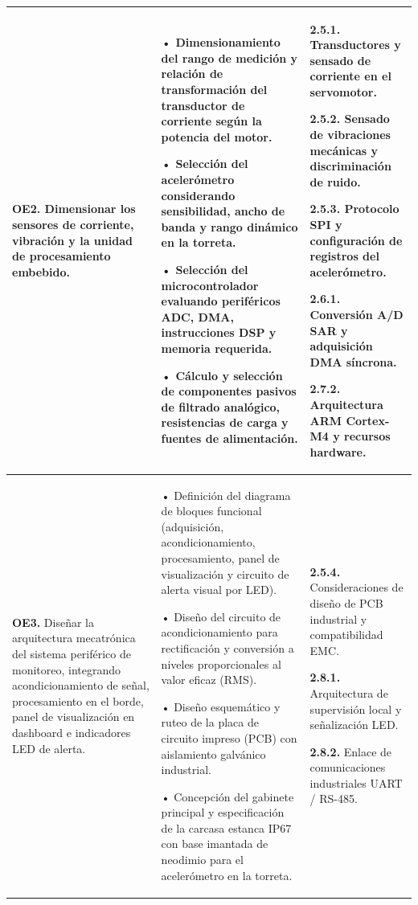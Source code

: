 {\begin{longtable}{>{\raggedright\arraybackslash}p{3.3cm}>{\raggedright\arraybackslash}p{5.2cm}>{\raggedright\arraybackslash}p{5.2cm}}
\textbf{OE2.} Dimensionar los sensores de corriente, vibración y la unidad de procesamiento embebido. &
• Dimensionamiento del rango de medición y relación de transformación del transductor de corriente según la potencia del motor.\par\vspace{1mm}
• Selección del acelerómetro considerando sensibilidad, ancho de banda y rango dinámico en la torreta.\par\vspace{1mm}
• Selección del microcontrolador evaluando periféricos ADC, DMA, instrucciones DSP y memoria requerida.\par\vspace{1mm}
• Cálculo y selección de componentes pasivos de filtrado analógico, resistencias de carga y fuentes de alimentación. &
\textbf{2.5.1.} Transductores y sensado de corriente en el servomotor.\par\vspace{1mm}
\textbf{2.5.2.} Sensado de vibraciones mecánicas y discriminación de ruido.\par\vspace{1mm}
\textbf{2.5.3.} Protocolo SPI y configuración de registros del acelerómetro.\par\vspace{1mm}
\textbf{2.6.1.} Conversión A/D SAR y adquisición DMA síncrona.\par\vspace{1mm}
\textbf{2.7.2.} Arquitectura ARM Cortex-M4 y recursos hardware. \\ \hline

\textbf{OE3.} Diseñar la arquitectura mecatrónica del sistema periférico de monitoreo, integrando acondicionamiento de señal, procesamiento en el borde, panel de visualización en dashboard e indicadores LED de alerta. &
• Definición del diagrama de bloques funcional (adquisición, acondicionamiento, procesamiento, panel de visualización y circuito de alerta visual por LED).\par\vspace{1mm}
• Diseño del circuito de acondicionamiento para rectificación y conversión a niveles proporcionales al valor eficaz (RMS).\par\vspace{1mm}
• Diseño esquemático y ruteo de la placa de circuito impreso (PCB) con aislamiento galvánico industrial.\par\vspace{1mm}
• Concepción del gabinete principal y especificación de la carcasa estanca IP67 con base imantada de neodimio para el acelerómetro en la torreta. &
\textbf{2.5.4.} Consideraciones de diseño de PCB industrial y compatibilidad EMC.\par\vspace{1mm}
\textbf{2.8.1.} Arquitectura de supervisión local y señalización LED.\par\vspace{1mm}
\textbf{2.8.2.} Enlace de comunicaciones industriales UART / RS-485. \\ \hline


\end{longtable}}
